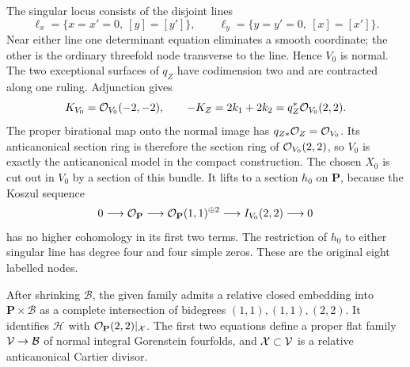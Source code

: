 The singular locus consists of the disjoint lines
\[
 \ell_x=\{x=x'=0,\ [y]=[y']\},\qquad
 \ell_y=\{y=y'=0,\ [x]=[x']\}.
\]
Near either line one determinant equation eliminates a smooth
coordinate; the other is the ordinary threefold node transverse
to the line. Hence $V_0$ is normal. The two exceptional surfaces
of $q_Z$ have codimension two and are contracted along one ruling.
Adjunction gives
\[
 K_{V_0}=\mathcal O_{V_0}(-2,-2),\qquad
 -K_Z=2k_1+2k_2=q_Z^*\mathcal O_{V_0}(2,2).
\]
The proper birational map onto the normal image has
$q_{Z*}\mathcal O_Z=\mathcal O_{V_0}$. Its anticanonical section ring is
therefore the section ring of $\mathcal O_{V_0}(2,2)$, so $V_0$ is
exactly the anticanonical model in the compact construction.
The chosen $X_0$ is cut out in $V_0$ by a section of this bundle.
It lifts to a section $h_0$ on $\mathbf P$, because the Koszul
sequence
\[
 0\longrightarrow\mathcal O_{\mathbf P}\longrightarrow
 \mathcal O_{\mathbf P}(1,1)^{\oplus2}\longrightarrow
 I_{V_0}(2,2)\longrightarrow0
\]
has no higher cohomology in its first two terms.
The restriction of $h_0$ to either singular line has degree four
and four simple zeros. These are the original eight labelled nodes.

\begin{proposition}\label{prop:relative-cicy}
After shrinking $\mathcal B$, the given family admits a relative
closed embedding into $\mathbf P\times\mathcal B$ as a complete
intersection of bidegrees $(1,1),(1,1),(2,2)$. It identifies
$\mathcal H$ with $\mathcal O_{\mathbf P}(2,2)|_{\mathcal X}$.
The first two equations define a proper flat family
$\mathcal V\to\mathcal B$ of normal integral Gorenstein fourfolds,
and $\mathcal X\subset\mathcal V$ is a relative anticanonical Cartier divisor.
\end{proposition}

